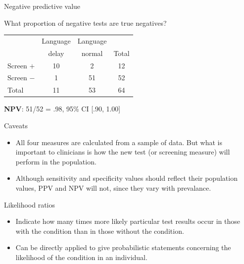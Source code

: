 \documentclass{beamer}
\begin{document}
\begin{frame}{Negative predictive value}
\begin{center}
What proportion of negative tests are true negatives? \\
\end{center}

\begin{center}
\begin{tabular}{l | c | c | c}
\toprule
& Language & Language & \\
& delay & normal & Total \\ 
\hline
Screen $+$ & 10 & 2 & 12 \\
\hline
Screen $-$ & \alert{1} & \alert{51} & \alert{52} \\
\hline
Total & 11 & 53 & 64 \\
\bottomrule
\end{tabular}
\end{center}

\begin{center}
\textbf{NPV}: 51/52 = .98, 95\% CI [.90, 1.00]
\end{center}
\end{frame}

\begin{frame}{Caveats}
	\begin{itemize}
	\item All four measures are calculated from a \alert{sample} of data. But what is important to clinicians is how the new test (or screening measure) will perform in the \alert{population}. 
	\item Although sensitivity and specificity values should reflect their population values, PPV and NPV will not, since they vary with \alert{prevalance}.
	\end{itemize}
\end{frame}

\begin{frame}{Likelihood ratios}
	\begin{itemize}
	\item Indicate how many times more likely particular test results occur in those with the condition than in those without the condition.
	\item Can be directly applied to give probabilistic statements concerning the likelihood of the condition in an individual.
	\end{itemize}
\end{frame}
\end{document}
